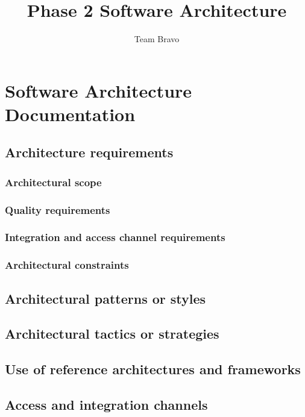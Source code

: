 \documentclass[11pt]{article}
\author{Team Bravo}
\title{Phase 2 Software Architecture}
\begin{document}
	\setlength{\parskip}{6pt}
	
	
	
	\renewcommand{\thesection}{\arabic{section}}
	\newpage
	
	\tableofcontents
	
	\newpage
	
	\section{Software Architecture Documentation}
	
	\subsection{Architecture requirements}
	
	\subsubsection{Architectural scope}
	
	\subsubsection{Quality requirements}
	
	\subsubsection{Integration and access channel requirements}
	
	\subsubsection{Architectural constraints}
	
	\newpage
	
	\subsection{Architectural patterns or styles}
	
	\newpage
	
	\subsection{Architectural tactics or strategies}
	
	\newpage
	
	\subsection{Use of reference architectures and frameworks}
	
	\newpage
	
	\subsection{Access and integration channels}
	
\end{document}
